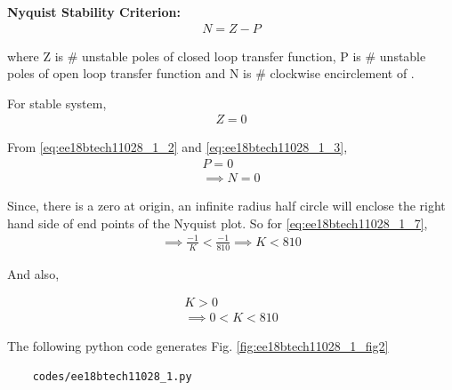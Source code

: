 \begin{enumerate}[label=\thesection.\arabic*.,ref=\thesection.\theenumi]
\textbf{Nyquist Stability Criterion:}
\begin{align}
    N = Z - P
\end{align}

where Z is \# unstable poles of closed loop transfer function, P is \# unstable poles of open loop transfer function
and N is \# clockwise encirclement of .

For stable system, 
\begin{align}
    Z = 0
\end{align}

From \eqref{eq:ee18btech11028_1_2} and \eqref{eq:ee18btech11028_1_3},
\begin{align}
    P = 0
\\
    \implies N = 0
    \label{eq:ee18btech11028_1_7}
\end{align}




Since, there is a zero at origin, an infinite radius half circle will enclose the right hand side of end points of the Nyquist plot.
So for \eqref{eq:ee18btech11028_1_7},
\begin{align}
    \implies \frac{-1}{K} < \frac{-1}{810}
    \implies K < 810
\end{align}

And also,

\begin{align}
    K > 0
\\
    \implies 0 < K < 810     
\end{align}


The following python code generates  Fig. \ref{fig:ee18btech11028_1_fig2}
\begin{lstlisting}
    codes/ee18btech11028_1.py
\end{lstlisting}
\end{enumerate}